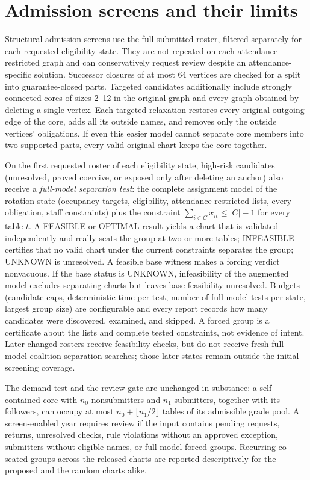 \documentclass[11pt,a4paper]{article}
\begin{document}
\section{Admission screens and their limits}
Structural admission screens use the full submitted roster, filtered separately for each requested eligibility state. They are not repeated on each attendance-restricted graph and can conservatively request review despite an attendance-specific solution. Successor closures of at most 64 vertices are checked for a split into guarantee-closed parts. Targeted candidates additionally include strongly connected cores of sizes 2--12 in the original graph and every graph obtained by deleting a single vertex. Each targeted relaxation restores every original outgoing edge of the core, adds all its outside names, and removes only the outside vertices' obligations. If even this easier model cannot separate core members into two supported parts, every valid original chart keeps the core together.

On the first requested roster of each eligibility state, high-risk candidates (unresolved, proved coercive, or exposed only after deleting an anchor) also receive a \emph{full-model separation test}: the complete assignment model of the rotation state (occupancy targets, eligibility, attendance-restricted lists, every obligation, staff constraints) plus the constraint $\sum_{i\in C}x_{it}\le|C|-1$ for every table $t$. A FEASIBLE or OPTIMAL result yields a chart that is validated independently and really seats the group at two or more tables; INFEASIBLE certifies that no valid chart under the current constraints separates the group; UNKNOWN is unresolved. A feasible base witness makes a forcing verdict nonvacuous. If the base status is UNKNOWN, infeasibility of the augmented model excludes separating charts but leaves base feasibility unresolved. Budgets (candidate caps, deterministic time per test, number of full-model tests per state, largest group size) are configurable and every report records how many candidates were discovered, examined, and skipped. A forced group is a certificate about the lists and complete tested constraints, not evidence of intent. Later changed rosters receive feasibility checks, but do not receive fresh full-model coalition-separation searches; those later states remain outside the initial screening coverage.

The demand test and the review gate are unchanged in substance: a self-contained core with $n_0$ nonsubmitters and $n_1$ submitters, together with its followers, can occupy at most $n_0+\lfloor n_1/2\rfloor$ tables of its admissible grade pool. A screen-enabled year requires review if the input contains pending requests, returns, unresolved checks, rule violations without an approved exception, submitters without eligible names, or full-model forced groups. Recurring co-seated groups across the released charts are reported descriptively for the proposed and the random charts alike.
\end{document}

